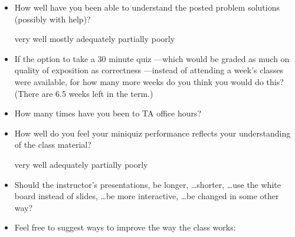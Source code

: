 \documentclass[handout]{mcs}
\begin{document}
\begin{itemize}
\item How well have you been able to understand the posted problem
  solutions (possibly with help)?
 
\begin{center}
very well\hspace{0.4in} mostly\hspace{0.4in} adequately\hspace{0.4in}
partially\hspace{0.4in} poorly
\end{center}

\item If the option to take a 30 minute quiz ---which would
  be graded as much on quality of exposition as correctness ---instead of
  attending a week's classes were available, for how many more weeks do you think
  you would do this?  (There are 6.5 weeks left in the term.)\hfill\examrule[0.7in]

\item How many times have you been to TA office hours?\hfill\examrule[0.7in]

\item How well do you feel your miniquiz performance reflects your
  understanding of the class material?

\begin{center}
very well\hspace{0.4in} adequately\hspace{0.4in} partially\hspace{0.4in} poorly
\end{center}

\end{itemize}


\begin{itemize}

\item Should the instructor's presentations, be longer, \dots shorter,
  \dots use the white board instead of slides, \dots be more
  interactive, \dots be changed in some other way?

\vspace{1in}%

\item Feel free to suggest ways to improve the way the class works:


\end{itemize}
\end{document}
